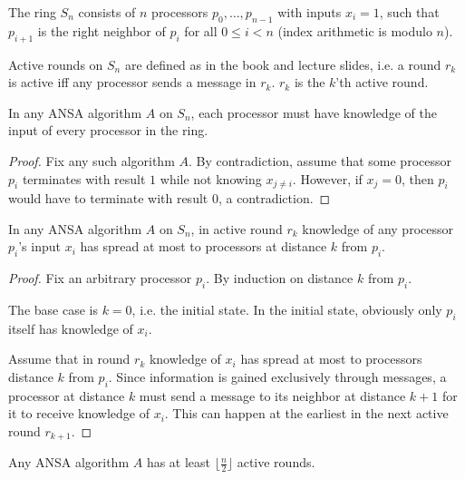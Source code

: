 \begin{definition}
The ring $S_n$ consists of $n$ processors $p_0, \ldots, p_{n-1}$ with inputs
$x_i = 1$, such that $p_{i+1}$ is the right neighbor
of $p_i$ for all $0 \leq i < n$ (index arithmetic is modulo $n$).
\end{definition}

\begin{definition}
Active rounds on $S_n$ are defined as in the book and lecture slides, i.e.
a round $r_k$ is active iff any processor sends a message in $r_k$.
$r_k$ is the $k$'th active round.
\end{definition}

\begin{lemma} \label{lemma:know_it_all}
In any ANSA algorithm $A$ on $S_n$, each processor must have knowledge of the 
input of every processor in the ring.
\end{lemma}

\begin{proof}
Fix any such algorithm $A$.
By contradiction, assume that some processor $p_i$ terminates with result $1$
while not knowing $x_{j \neq i}$. However, if $x_j = 0$, then $p_i$ would have to
terminate with result $0$, a contradiction.
\end{proof}

\begin{lemma} \label{lemma:knowledge_spread}
In any ANSA algorithm $A$ on $S_n$, in active round $r_k$ knowledge of any processor
$p_i$'s input $x_i$ has spread at most to processors at distance $k$ from
$p_i$.
\end{lemma}

\begin{proof}
Fix an arbitrary processor $p_i$.
By induction on distance $k$ from $p_i$.

The base case is $k = 0$, i.e. the initial state. In the initial state,
obviously only $p_i$ itself has knowledge of $x_i$.

Assume that in round $r_k$ knowledge of $x_i$ has spread at most to processors
distance $k$ from $p_i$. Since information is gained exclusively through messages,
a processor at distance $k$ must send a message to its neighbor at distance $k+1$
for it to receive knowledge of $x_i$. This can happen at the earliest in the
next active round $r_{k+1}$.
\end{proof}

\begin{lemma} \label{lemma:nr_rounds}
Any ANSA algorithm $A$ has at least $\lfloor \frac{n}{2} \rfloor$ active rounds.
\end{lemma}

